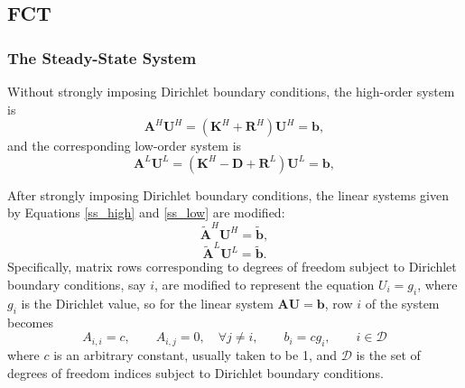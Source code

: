 \subsection{FCT}
\subsubsection{The Steady-State System}
Without strongly imposing Dirichlet boundary conditions, the high-order system is
\begin{equation}\label{ss_high}
   \mathbf{A}^H\mathbf{U}^H = (\mathbf{K}^H + \mathbf{R}^H)\mathbf{U}^H = \mathbf{b},
\end{equation}
and the corresponding low-order system is
\begin{equation}\label{ss_low}
   \mathbf{A}^L\mathbf{U}^L = (\mathbf{K}^H - \mathbf{D} + \mathbf{R}^L)\mathbf{U}^L = \mathbf{b},
\end{equation}

After strongly imposing Dirichlet boundary conditions, the linear
systems given by Equations \ref{ss_high} and \ref{ss_low} are modified:
\begin{equation}\label{ss_highD}
   \tilde{\mathbf{A}}^H\mathbf{U}^H = \tilde{\mathbf{b}},
\end{equation}
\begin{equation}\label{ss_lowD}
   \tilde{\mathbf{A}}^L\mathbf{U}^L = \tilde{\mathbf{b}}.
\end{equation}
Specifically, matrix rows corresponding to degrees of freedom subject to Dirichlet
boundary conditions, say $i$, are modified to represent the equation
$U_i = g_i$, where $g_i$ is the Dirichlet value, so for the linear system
$\mathbf{A}\mathbf{U}=\mathbf{b}$, row $i$ of the system becomes
\[
   A_{i,i} = c, \qquad A_{i,j} = 0, \quad\forall j\ne i, \qquad b_i = c g_i,
      \qquad i\in \mathcal{D}
\]
where $c$ is an arbitrary constant, usually taken to be 1, and $\mathcal{D}$ is the set
of degrees of freedom indices subject to Dirichlet boundary conditions.
